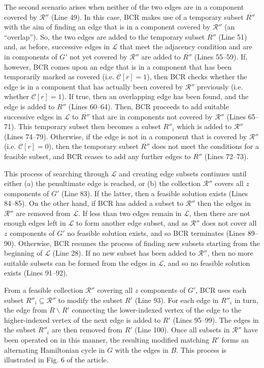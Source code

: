 \documentclass[a4paper,11pt]{article}
\begin{document}
The second scenario arises when neither of the two edges are in a component covered by $\mathcal{R}''$ (Line 49). In this case, BCR makes use of a temporary subset $\overline{R''}$ with the aim of finding an edge that is in a component covered by $\mathcal{R}''$ (an ``overlap''). So, the two edges are added to the temporary subset $\overline{R''}$ (Line 51) and, as before, successive edges in $\mathcal{L}$ that meet the adjacency condition and are in components of $G'$ not yet covered by $\mathcal{R}''$ are added to $\overline{R''}$ (Lines 55--59). If, however, BCR comes upon an edge that is in a component that has been temporarily marked as covered (i.e. $\overline{\mathcal{C}}[r] = 1$), then BCR checks whether the edge is in a component that has actually been covered by $\mathcal{R}''$ previously (i.e. whether $\mathcal{C}[r] = 1$). If true, then an overlapping edge has been found, and the edge is added to $\overline{R''}$ (Lines 60--64). Then, BCR proceeds to add suitable successive edges in $\mathcal{L}$ to $\overline{R''}$ that are in components not covered by $\mathcal{R}''$ (Lines 65--71). This temporary subset then becomes a subset $R''_i$ which is added to $\mathcal{R}''$ (Lines 74--79). Otherwise, if the edge is not in a component that is covered by $\mathcal{R}''$ (i.e. $\mathcal{C}[r] = 0$), then the temporary subset $\overline{R''}$ does not meet the conditions for a feasible subset, and BCR ceases to add any further edges to $\overline{R''}$ (Lines 72--73). 

This process of searching through $\mathcal{L}$ and creating edge subsets continues until either (a) the penultimate edge is reached, or (b) the collection $\mathcal{R}''$ covers all $z$ components of $G'$ (Line 83). If the latter, then a feasible solution exists (Lines 84--85). On the other hand, if BCR has added a subset to $\mathcal{R}''$ then the edges in $\mathcal{R}''$ are removed from $\mathcal{L}$. If less than two edges remain in $\mathcal{L}$, then there are not enough edges left in $\mathcal{L}$ to form another edge subset, and as $\mathcal{R}''$ does not cover all $z$ components of $G'$ no feasible solution exists, and so BCR terminates (Lines 89--90). Otherwise, BCR resumes the process of finding new subsets starting from the beginning of $\mathcal{L}$ (Line 28). If no new subset has been added to $\mathcal{R}''$, then no more suitable subsets can be formed from the edges in $\mathcal{L}$, and so no feasible solution exists (Lines 91--92). 

From a feasible collection $\mathcal{R}''$ covering all $z$ components of $G'$, BCR uses each subset $R''_i \subseteq \mathcal{R}''$ to modify the subset $R'$ (Line 93). For each edge in $R''_i$ in turn, the edge from $R \backslash R'$ connecting the lower-indexed vertex of the edge to the higher-indexed vertex of the next edge is added to $R'$ (Lines 95--99). The edges in the subset $R''_i$ are then removed from $R'$ (Line 100). Once all subsets in $\mathcal{R}''$ have been operated on in this manner, the resulting modified matching $R'$ forms an alternating Hamiltonian cycle in $G$ with the edges in $B$. This process is illustrated in Fig. 6 of the article.








	
\end{document}
